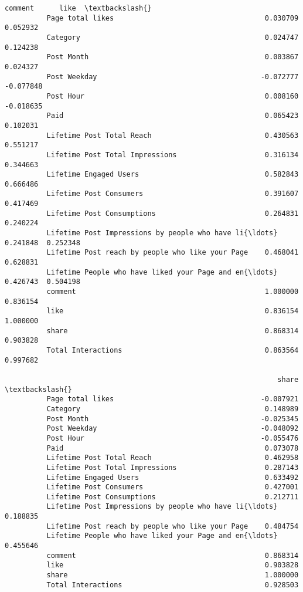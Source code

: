 \documentclass[11pt]{article}
\begin{document}
\begin{Verbatim}[commandchars=\\\{\}]
                                                               comment      like  \textbackslash{}
          Page total likes                                    0.030709  0.052932   
          Category                                            0.024747  0.124238   
          Post Month                                          0.003867  0.024327   
          Post Weekday                                       -0.072777 -0.077848   
          Post Hour                                           0.008160 -0.018635   
          Paid                                                0.065423  0.102031   
          Lifetime Post Total Reach                           0.430563  0.551217   
          Lifetime Post Total Impressions                     0.316134  0.344663   
          Lifetime Engaged Users                              0.582843  0.666486   
          Lifetime Post Consumers                             0.391607  0.417469   
          Lifetime Post Consumptions                          0.264831  0.240224   
          Lifetime Post Impressions by people who have li{\ldots}  0.241848  0.252348   
          Lifetime Post reach by people who like your Page    0.468041  0.628831   
          Lifetime People who have liked your Page and en{\ldots}  0.426743  0.504198   
          comment                                             1.000000  0.836154   
          like                                                0.836154  1.000000   
          share                                               0.868314  0.903828   
          Total Interactions                                  0.863564  0.997682   
          
                                                                 share  \textbackslash{}
          Page total likes                                   -0.007921   
          Category                                            0.148989   
          Post Month                                         -0.025345   
          Post Weekday                                       -0.048092   
          Post Hour                                          -0.055476   
          Paid                                                0.073078   
          Lifetime Post Total Reach                           0.462958   
          Lifetime Post Total Impressions                     0.287143   
          Lifetime Engaged Users                              0.633492   
          Lifetime Post Consumers                             0.427001   
          Lifetime Post Consumptions                          0.212711   
          Lifetime Post Impressions by people who have li{\ldots}  0.188835   
          Lifetime Post reach by people who like your Page    0.484754   
          Lifetime People who have liked your Page and en{\ldots}  0.455646   
          comment                                             0.868314   
          like                                                0.903828   
          share                                               1.000000   
          Total Interactions                                  0.928503   
          

\end{Verbatim}
\end{document}
